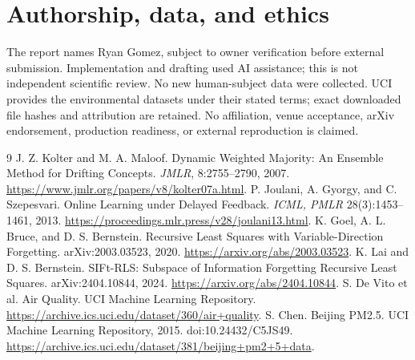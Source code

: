 \documentclass[10pt]{article}
\begin{document}
\section{Authorship, data, and ethics}
The report names Ryan Gomez, subject to owner verification before external submission. Implementation and drafting used AI assistance; this is not independent scientific review. No new human-subject data were collected. UCI provides the environmental datasets under their stated terms; exact downloaded file hashes and attribution are retained. No affiliation, venue acceptance, arXiv endorsement, production readiness, or external reproduction is claimed.

\begin{thebibliography}{9}
 J. Z. Kolter and M. A. Maloof. Dynamic Weighted Majority: An Ensemble Method for Drifting Concepts. \emph{JMLR}, 8:2755--2790, 2007. \url{https://www.jmlr.org/papers/v8/kolter07a.html}.
 P. Joulani, A. Gyorgy, and C. Szepesvari. Online Learning under Delayed Feedback. \emph{ICML, PMLR} 28(3):1453--1461, 2013. \url{https://proceedings.mlr.press/v28/joulani13.html}.
 K. Goel, A. L. Bruce, and D. S. Bernstein. Recursive Least Squares with Variable-Direction Forgetting. arXiv:2003.03523, 2020. \url{https://arxiv.org/abs/2003.03523}.
 K. Lai and D. S. Bernstein. SIFt-RLS: Subspace of Information Forgetting Recursive Least Squares. arXiv:2404.10844, 2024. \url{https://arxiv.org/abs/2404.10844}.
 S. De Vito et al. Air Quality. UCI Machine Learning Repository. \url{https://archive.ics.uci.edu/dataset/360/air+quality}.
 S. Chen. Beijing PM2.5. UCI Machine Learning Repository, 2015. doi:10.24432/C5JS49. \url{https://archive.ics.uci.edu/dataset/381/beijing+pm2+5+data}.
\end{thebibliography}
\end{document}
